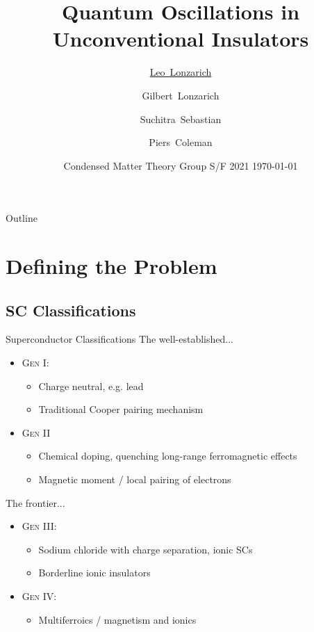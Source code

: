 \documentclass{beamer}
\title[Quantum Oscillations] 
{%
 Quantum Oscillations in\\ Unconventional Insulators%
}
\author[Lonzarich]
{
  \underline{Leo~Lonzarich} \and Gilbert~Lonzarich\inst{1} \and Suchitra~Sebastian\inst{1} \and Piers~Coleman\inst{2}
}
\institute[Cambridge]
{
\inst{1}%
Cavendish Laboratory, University of Cambridge, UK\\
\inst{2}%
Materials Theory Group, Rutgers University, USA
}
\date[CMS2021]
{Condensed Matter Theory Group S/F 2021 \hfill \today}
\begin{document}
\begin{frame}
  \titlepage
\end{frame}

\begin{frame}{Outline}
  \tableofcontents
\end{frame}


\section{Defining the Problem}


\subsection{SC Classifications}

\begin{frame}
{Superconductor Classifications}
    The well-established...
    \begin{itemize}
        \item \textsc{Gen I}:
        
            \begin{itemize}
                \item Charge neutral, e.g. lead
                \item Traditional Cooper pairing mechanism
            \end{itemize}
            
        \item \textsc{Gen II}
            \begin{itemize}
            
                \item Chemical doping, quenching long-range ferromagnetic effects
                \item Magnetic moment / local pairing of electrons
                
            \end{itemize}
    \end{itemize}
    The frontier...
    \begin{itemize}
        \item \textsc{Gen III}: %
            \begin{itemize}
                \item Sodium chloride with charge separation, ionic SCs
                \item Borderline ionic insulators
            \end{itemize}
        \item \textsc{Gen IV}:
            \begin{itemize}
                \item Multiferroics / magnetism and ionics
            \end{itemize}
    \end{itemize}
        
        
 
\end{frame}
\end{document}
